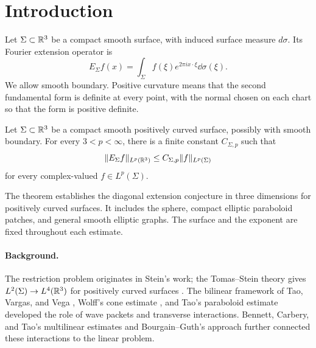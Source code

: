 \providecommand{\PacketTheoremNumber}{6.4}
\providecommand{\PacketBoundEquation}{6.8}
\providecommand{\PacketPhaseSection}{6.1}
\providecommand{\PacketFamilyDefinition}{6.3}
\providecommand{\PacketProofSection}{7}

\section{Introduction}\label{sec:introduction}

Let \(\Sigma\subset\mathbb R^3\) be a compact smooth surface, with induced
surface measure \(d\sigma\). Its Fourier extension operator is
\[
 E_\Sigma f(x)=\int_\Sigma f(\xi)e^{2\pi i x\cdot\xi}\dd\sigma(\xi).
\]
We allow smooth boundary. Positive curvature means that the second
fundamental form is definite at every point, with the normal chosen
on each chart so that the form is positive definite.

\begin{theorem}\label{thm:main}
Let \(\Sigma\subset\mathbb R^3\) be a compact smooth positively curved
surface, possibly with smooth boundary. For every \(3<p<\infty\),
there is a finite constant \(C_{\Sigma,p}\) such that
\begin{equation}\label{eq:main}
 \|E_\Sigma f\|_{L^p(\mathbb R^3)}
 \le C_{\Sigma,p}\|f\|_{L^p(\Sigma)}
\end{equation}
for every complex-valued \(f\in L^p(\Sigma)\).
\end{theorem}

The theorem establishes the diagonal extension conjecture in three
dimensions for positively curved surfaces. It includes the sphere,
compact elliptic paraboloid patches, and general smooth elliptic
graphs. The surface and the exponent are fixed throughout each
estimate.

\paragraph{Background.}
The restriction problem originates in Stein's work; the
Tomas--Stein theory gives \(L^2(\Sigma)\to L^4(\mathbb R^3)\)
for positively curved surfaces \cite{Tomas1975,Stein1979}.
The bilinear framework of Tao, Vargas, and Vega
\cite{TaoVargasVega1998}, Wolff's cone estimate \cite{Wolff2001},
and Tao's paraboloid estimate \cite{Tao2003} developed the role of
wave packets and transverse interactions. Bennett, Carbery, and Tao's
multilinear estimates \cite{BennettCarberyTao2006} and
Bourgain--Guth's approach \cite{BourgainGuth2011} further connected
these interactions to the linear problem.

